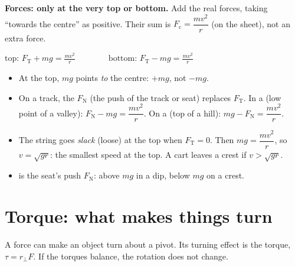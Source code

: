 \par\noindent\begin{minipage}{\linewidth}
\textbf{Forces: only at the very top or bottom.} Add the real forces, taking ``towards the
centre'' as positive. Their sum is $F_\mathrm{c} = \dfrac{mv^2}{r}$ (on the sheet), not an extra force.
\begin{center}
  $\displaystyle \text{top: } F_\mathrm{T} + mg = \frac{mv^2}{r} \qquad\qquad
    \text{bottom: } F_\mathrm{T} - mg = \frac{mv^2}{r}$\\[4pt]
  \hscbadgenotonsheet
\end{center}
\end{minipage}
\begin{itemize}
  \item At the top, $mg$ points \emph{to} the centre: $+mg$, not $-mg$.
  \item On a track, the  $F_\mathrm{N}$ (the push of the track or seat) replaces
        $F_\mathrm{T}$. In a  (low point of a valley): $F_\mathrm{N} - mg = \dfrac{mv^2}{r}$.
        On a  (top of a hill): $mg - F_\mathrm{N} = \dfrac{mv^2}{r}$.
  \item The string goes \emph{slack} (loose) at the top when $F_\mathrm{T} = 0$. Then
        $mg = \dfrac{mv^2}{r}$, so $v = \sqrt{gr}$: the smallest speed at the top. A cart leaves a
        crest if $v > \sqrt{gr}$.
  \item {} is the seat's push $F_\mathrm{N}$: above $mg$ in a dip, below $mg$
        on a crest.
\end{itemize}

\section{Torque: what makes things turn}\label{ch3:sec:torque}

\begin{bigidea}
A force can make an object turn about a pivot. Its turning effect is the torque,
$\tau = r_\perp F$. If the torques balance, the rotation does not change.
\end{bigidea}

\begin{keywords}
\end{keywords}

